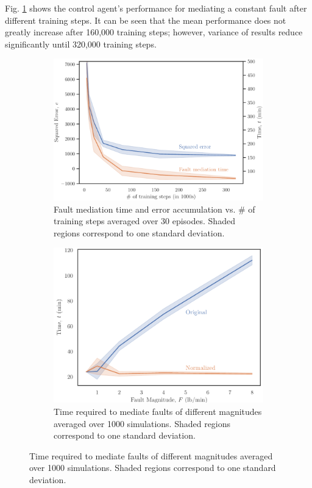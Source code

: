 Fig. \ref{fig:training_time} shows the control agent's performance for mediating a constant fault after different training steps. It can be seen that the mean performance does not greatly increase after 160,000 training steps; however, variance of results reduce significantly until 320,000  training steps.
\begin{figure}[h]
    \begin{center}
    \begin{subfigure}[b]{0.49\textwidth}
        \includegraphics[width=\textwidth]{images/ftc/training_time.pdf}
        \caption{{\scriptsize Fault mediation time and error accumulation vs. \# of training steps averaged over 30 episodes. Shaded regions correspond to one standard deviation.}}
        \label{fig:training_time} 
    \end{subfigure}
    \begin{subfigure}[b]{0.46\textwidth}
        \includegraphics[width=\textwidth]{images/ftc/time_to_mediate.pdf}
        \caption{\label{fig:time_to_mediate} {\scriptsize Time required to mediate faults of different magnitudes averaged over 1000 simulations.  Shaded regions correspond to one standard deviation.}}
    \end{subfigure}
    \end{center}
\end{figure}

